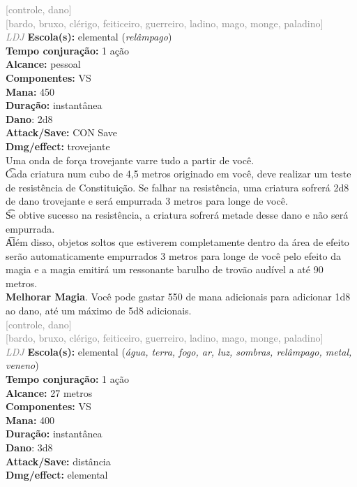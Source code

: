 \documentclass{RPG_Adventure}[2021/10/20]
\begin{document}
{\scriptsize \textcolor{gray}{[controle, dano]\\}}
{\scriptsize \textcolor{gray}{[bardo, bruxo, clérigo, feiticeiro, guerreiro, ladino, mago, monge, paladino]\\}}
{\tiny \textcolor{gray}{\textit{LDJ}}}
{\small \t \textbf{Escola(s):} elemental (\textit{relâmpago})\\\t \textbf{Tempo conjuração:} 1 ação\\\t \textbf{Alcance:} pessoal\\\t \textbf{Componentes:} VS\\\t \textbf{Mana:} 450\\\t \textbf{Duração:} instantânea\\\t \textbf{Dano}: 2d8\\\t \textbf{Attack/Save:} CON Save\\\t \textbf{Dmg/effect:} trovejante\\}
{\normalsize Uma onda de força trovejante varre tudo a partir de você.\\\t Cada criatura num cubo de 4,5 metros originado em você, deve realizar um teste de resistência de Constituição. Se falhar na resistência, uma criatura sofrerá 2d8 de dano trovejante e será empurrada 3 metros para longe de você.\\\t Se obtive sucesso na resistência, a criatura sofrerá metade desse dano e não será empurrada.\\\t Além disso, objetos soltos que estiverem completamente dentro da área de efeito serão automaticamente empurrados 3 metros para longe de você pelo efeito da magia e a magia emitirá um ressonante barulho de trovão audível a até 90 metros.\\\t \textbf{Melhorar Magia}. Você pode gastar 550 de mana adicionais para adicionar 1d8 ao dano, até um máximo de 5d8 adicionais.\\}
{\scriptsize \textcolor{gray}{[controle, dano]\\}}
{\scriptsize \textcolor{gray}{[bardo, bruxo, clérigo, feiticeiro, guerreiro, ladino, mago, monge, paladino]\\}}
{\tiny \textcolor{gray}{\textit{LDJ}}}
{\small \t \textbf{Escola(s):} elemental (\textit{água, terra, fogo, ar, luz, sombras, relâmpago, metal, veneno})\\\t \textbf{Tempo conjuração:} 1 ação\\\t \textbf{Alcance:} 27 metros\\\t \textbf{Componentes:} VS\\\t \textbf{Mana:} 400\\\t \textbf{Duração:} instantânea\\\t \textbf{Dano}: 3d8\\\t \textbf{Attack/Save:} distância\\\t \textbf{Dmg/effect:} elemental\\}
\end{document}
